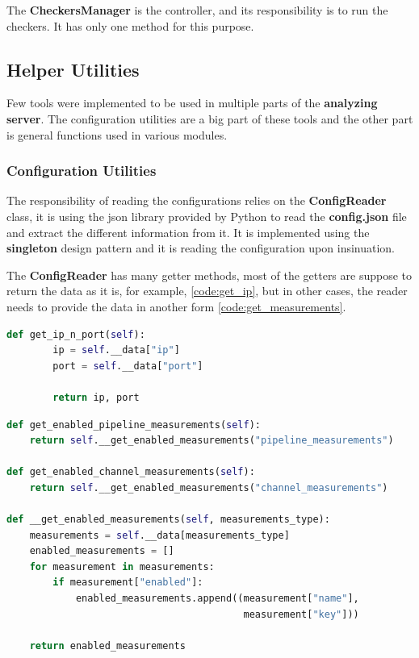 The \textbf{CheckersManager} is the controller, and its responsibility is to run the checkers. It has
only one method for this purpose.

\subsection{Helper Utilities}
Few tools were implemented to be used in multiple parts of the \textbf{analyzing server}. The
configuration utilities are a big part of these tools and the other part is general functions used in
various modules.

\subsubsection{Configuration Utilities}\label{sec:config_utils}
The responsibility of reading the configurations relies on the \textbf{ConfigReader} class, it is using
the json library provided by Python to read the \textbf{config.json} file and extract the different
information from it. It is implemented using the \textbf{singleton} design pattern and it is reading the
configuration upon insinuation.

The \textbf{ConfigReader} has many getter methods, most of the getters are suppose to return the data as 
it is, for example, \ref{code:get_ip}, but in other cases, the reader needs to provide the data in another 
form \ref{code:get_measurements}.
\newline
\begin{lstlisting}[language=Python,label={code:get_ip}, caption={Simple getter in ConfigReader},captionpos=b]
	def get_ip_n_port(self):
		ip = self.__data["ip"]
		port = self.__data["port"]
	
		return ip, port
\end{lstlisting}

\begin{lstlisting}[language=Python,label={code:get_measurements}, caption={Measurements getters in ConfigReader},captionpos=b]
def get_enabled_pipeline_measurements(self):
	return self.__get_enabled_measurements("pipeline_measurements")

def get_enabled_channel_measurements(self):
	return self.__get_enabled_measurements("channel_measurements")

def __get_enabled_measurements(self, measurements_type):
	measurements = self.__data[measurements_type]
	enabled_measurements = []
	for measurement in measurements:
		if measurement["enabled"]:
			enabled_measurements.append((measurement["name"],
										 measurement["key"]))

	return enabled_measurements
\end{lstlisting}


